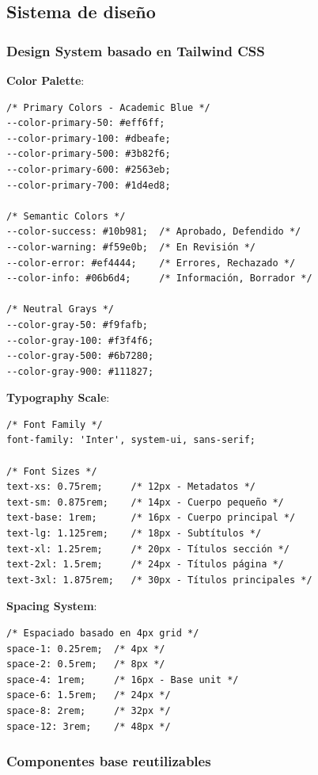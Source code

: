 \documentclass[12pt,a4paper,oneside]{report}
\begin{document}
\subsection{Sistema de diseño}\label{sistema-de-diseuxf1o}

\subsubsection{Design System basado en Tailwind
CSS}\label{design-system-basado-en-tailwind-css}

\textbf{Color Palette}:

\begin{lstlisting}
/* Primary Colors - Academic Blue */
--color-primary-50: #eff6ff;
--color-primary-100: #dbeafe;
--color-primary-500: #3b82f6;
--color-primary-600: #2563eb;
--color-primary-700: #1d4ed8;

/* Semantic Colors */
--color-success: #10b981;  /* Aprobado, Defendido */
--color-warning: #f59e0b;  /* En Revisión */
--color-error: #ef4444;    /* Errores, Rechazado */
--color-info: #06b6d4;     /* Información, Borrador */

/* Neutral Grays */
--color-gray-50: #f9fafb;
--color-gray-100: #f3f4f6;
--color-gray-500: #6b7280;
--color-gray-900: #111827;
\end{lstlisting}

\textbf{Typography Scale}:

\begin{lstlisting}
/* Font Family */
font-family: 'Inter', system-ui, sans-serif;

/* Font Sizes */
text-xs: 0.75rem;     /* 12px - Metadatos */
text-sm: 0.875rem;    /* 14px - Cuerpo pequeño */
text-base: 1rem;      /* 16px - Cuerpo principal */
text-lg: 1.125rem;    /* 18px - Subtítulos */
text-xl: 1.25rem;     /* 20px - Títulos sección */
text-2xl: 1.5rem;     /* 24px - Títulos página */
text-3xl: 1.875rem;   /* 30px - Títulos principales */
\end{lstlisting}

\textbf{Spacing System}:

\begin{lstlisting}
/* Espaciado basado en 4px grid */
space-1: 0.25rem;  /* 4px */
space-2: 0.5rem;   /* 8px */
space-4: 1rem;     /* 16px - Base unit */
space-6: 1.5rem;   /* 24px */
space-8: 2rem;     /* 32px */
space-12: 3rem;    /* 48px */
\end{lstlisting}

\subsubsection{Componentes base
reutilizables}\label{componentes-base-reutilizables}
\end{document}
